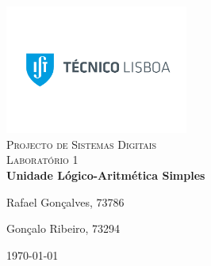 \begin{titlepage}

\begin{center}

\includegraphics[width=6cm]{./title}\\[3cm]

\textsc{\LARGE Projecto de Sistemas Digitais}\\[1.5cm]

\textsc{\Large Laboratório 1}\\[1.5cm]


{ \huge \bfseries Unidade Lógico-Aritmética Simples \\[3cm] }


\noindent
\begin{minipage}{0.4\textwidth}
\begin{flushleft} \large
Rafael Gonçalves, 73786
\end{flushleft}
\end{minipage}
\begin{minipage}{0.4\textwidth}
\begin{flushright} \large
Gonçalo Ribeiro, 73294
\end{flushright}
\end{minipage}

\vfill

{\large \today}


\end{center}

\end{titlepage}